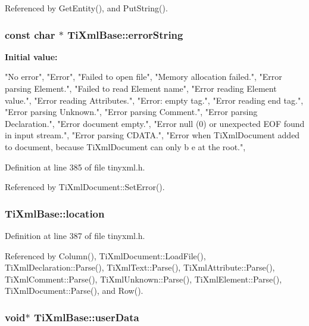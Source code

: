Referenced by GetEntity(), and PutString().\hypertarget{class_ti_xml_base_a7ac8feec4100e446b3d78e1ac0659700}{
\subsubsection[{errorString}]{\setlength{\rightskip}{0pt plus 5cm}const char $\ast$ {\bf TiXmlBase::errorString}}}
\label{class_ti_xml_base_a7ac8feec4100e446b3d78e1ac0659700}
{\bfseries Initial value:}
\begin{DoxyCode}

  {
    "No error",
    "Error",
    "Failed to open file",
    "Memory allocation failed.",
    "Error parsing Element.",
    "Failed to read Element name",
    "Error reading Element value.",
    "Error reading Attributes.",
    "Error: empty tag.",
    "Error reading end tag.",
    "Error parsing Unknown.",
    "Error parsing Comment.",
    "Error parsing Declaration.",
    "Error document empty.",
    "Error null (0) or unexpected EOF found in input stream.",
    "Error parsing CDATA.",
    "Error when TiXmlDocument added to document, because TiXmlDocument can only b
      e at the root.",
  }
\end{DoxyCode}


Definition at line 385 of file tinyxml.h.

Referenced by TiXmlDocument::SetError().\hypertarget{class_ti_xml_base_a0d992580f3bc264909f898e942677a3c}{
\subsubsection[{location}]{ {\bf TiXmlBase::location}}}
\label{class_ti_xml_base_a0d992580f3bc264909f898e942677a3c}


Definition at line 387 of file tinyxml.h.

Referenced by Column(), TiXmlDocument::LoadFile(), TiXmlDeclaration::Parse(), TiXmlText::Parse(), TiXmlAttribute::Parse(), TiXmlComment::Parse(), TiXmlUnknown::Parse(), TiXmlElement::Parse(), TiXmlDocument::Parse(), and Row().\hypertarget{class_ti_xml_base_ab242c01590191f644569fa89a080d97c}{
\subsubsection[{userData}]{\setlength{\rightskip}{0pt plus 5cm}void$\ast$ {\bf TiXmlBase::userData}}}
\label{class_ti_xml_base_ab242c01590191f644569fa89a080d97c}


